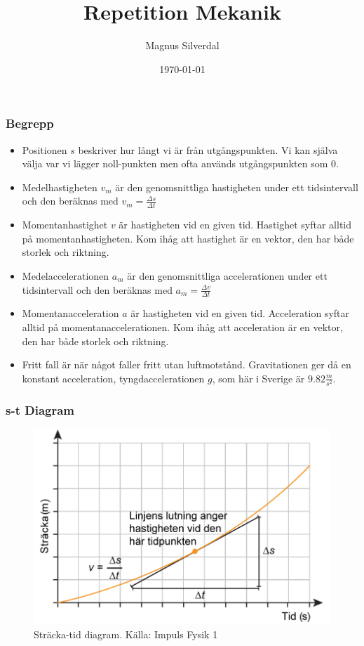 \documentclass[11pt]{beamer}
\title{Repetition Mekanik}
\author{Magnus Silverdal}
\institute{NTI Gymnasiet}
\date{\today}
\begin{document}
    \frame{\titlepage}

    \begin{frame}
        \frametitle{Begrepp}
        \begin{itemize}
            \item Positionen $s$ beskriver hur långt vi är från utgångspunkten. Vi kan själva välja var vi lägger noll-punkten
            men ofta används utgångspunkten som 0.
            \item Medelhastigheten $v_m$ är den genomsnittliga hastigheten under ett tidsintervall och den beräknas med
            $v_m=\frac{\Delta s}{\Delta t}$
            \item Momentanhastighet $v$ är hastigheten vid en given tid. Hastighet syftar alltid på momentanhastigheten.
            Kom ihåg att hastighet är en vektor, den har både storlek och riktning.
            \item Medelaccelerationen $a_m$ är den genomsnittliga accelerationen under ett tidsintervall och den beräknas med
            $a_m=\frac{\Delta v}{\Delta t}$
            \item Momentanacceleration $a$ är hastigheten vid en given tid. Acceleration syftar alltid på momentanaccelerationen.
            Kom ihåg att acceleration är en vektor, den har både storlek och riktning.
            \item Fritt fall är när något faller fritt utan luftmotstånd. Gravitationen ger då en konstant acceleration,
            tyngdaccelerationen $g$, som här i Sverige är $9.82 \frac{m}{s^2}$.
        \end{itemize}
    \end{frame}
    \begin{frame}
        \frametitle{s-t Diagram}
        \begin{figure}[!h]
            \includegraphics[width=\textwidth]{../images/chapter3/DistTime.png}
            \caption{Sträcka-tid diagram. Källa: Impuls Fysik 1}
        \end{figure}
    \end{frame}
\end{document}
